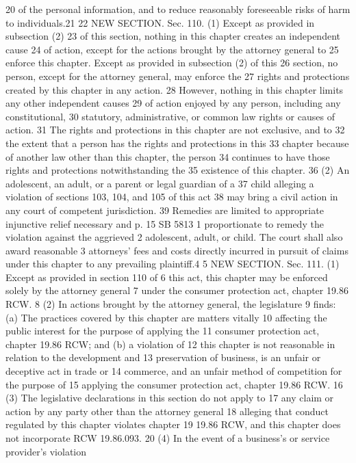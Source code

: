 20 of the personal information, and to reduce reasonably foreseeable
risks of harm to individuals.21
22 NEW SECTION. Sec. 110. (1) Except as provided in subsection (2)
23 of this section, nothing in this chapter creates an independent cause
24 of action, except for the actions brought by the attorney general to
25 enforce this chapter. Except as provided in subsection (2) of this
26 section, no person, except for the attorney general, may enforce the
27 rights and protections created by this chapter in any action.
28 However, nothing in this chapter limits any other independent causes
29 of action enjoyed by any person, including any constitutional,
30 statutory, administrative, or common law rights or causes of action.
31 The rights and protections in this chapter are not exclusive, and to
32 the extent that a person has the rights and protections in this
33 chapter because of another law other than this chapter, the person
34 continues to have those rights and protections notwithstanding the
35 existence of this chapter.
36 (2) An adolescent, an adult, or a parent or legal guardian of a
37 child alleging a violation of sections 103, 104, and 105 of this act
38 may bring a civil action in any court of competent jurisdiction.
39 Remedies are limited to appropriate injunctive relief necessary and
p. 15 SB 5813
1 proportionate to remedy the violation against the aggrieved
2 adolescent, adult, or child. The court shall also award reasonable
3 attorneys' fees and costs directly incurred in pursuit of claims
under this chapter to any prevailing plaintiff.4
5 NEW SECTION. Sec. 111. (1) Except as provided in section 110 of
6 this act, this chapter may be enforced solely by the attorney general
7 under the consumer protection act, chapter 19.86 RCW.
8 (2) In actions brought by the attorney general, the legislature
9 finds: (a) The practices covered by this chapter are matters vitally
10 affecting the public interest for the purpose of applying the
11 consumer protection act, chapter 19.86 RCW; and (b) a violation of
12 this chapter is not reasonable in relation to the development and
13 preservation of business, is an unfair or deceptive act in trade or
14 commerce, and an unfair method of competition for the purpose of
15 applying the consumer protection act, chapter 19.86 RCW.
16 (3) The legislative declarations in this section do not apply to
17 any claim or action by any party other than the attorney general
18 alleging that conduct regulated by this chapter violates chapter
19 19.86 RCW, and this chapter does not incorporate RCW 19.86.093.
20 (4) In the event of a business's or service provider's violation
